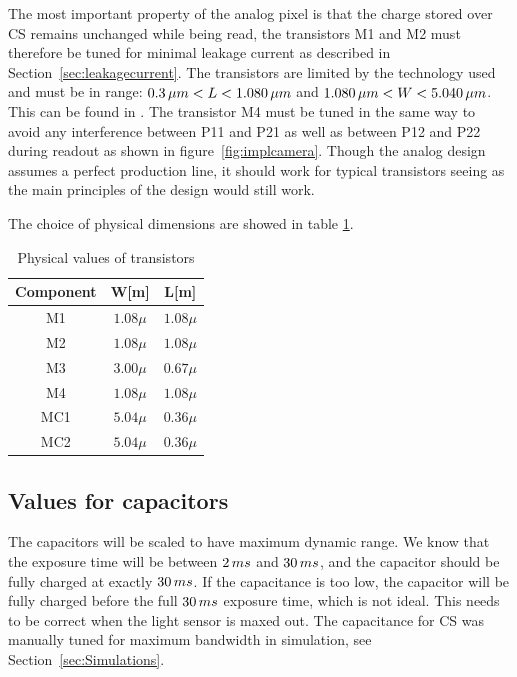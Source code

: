 The most important property of the analog pixel is that the charge stored over CS remains unchanged while being read,
the transistors M1 and M2 must therefore be tuned for minimal leakage current as described in Section~\ref{sec:leakagecurrent}.
The transistors are limited by the technology used and must be in range: $0.3 \mskip3mu \mu m < L < 1.080 \mskip3mu \mu m$ and $1.080 \mskip3mu \mu m < W < 5.040 \mskip3mu \mu m $. This can be found in \cite{oppgave}.
The transistor M4 must be tuned in the same way to avoid any interference between P11 and P21 as well as between P12 and P22 during readout as shown in figure~\ref{fig:implcamera}.
Though the analog design assumes a perfect production line, it should work for typical transistors seeing as the main principles of the design would still work.

The choice of physical dimensions are showed in table \ref{tab:transcomponentvalues}.

\begin{table}[htbp]
  \centering
  \caption{Physical values of transistors}
  \begin{tabular}{ c | c c }
    Component & W[m] & L[m] \\
    \midrule
    M1 & $1.08\mu$ & $1.08\mu$ \\
    M2 & $1.08\mu$ & $1.08\mu$ \\
    M3 & $3.00\mu$ & $0.67\mu$ \\
    M4 & $1.08\mu$ & $1.08\mu$ \\
    MC1 & $5.04\mu$ & $0.36\mu$ \\
    MC2 & $5.04\mu$ & $0.36\mu$
  \end{tabular}
  \label{tab:transcomponentvalues}
\end{table}



\subsection{Values for capacitors}

The capacitors will be scaled to have maximum dynamic range. We know that the exposure time  will be between $2 \mskip3mu ms$ and $30 \mskip3mu ms$, and the capacitor should be fully charged at exactly $30 \mskip3mu ms$. If the capacitance is too low, the capacitor will be fully charged before the full $30 \mskip3mu ms$ exposure time, which is not ideal. This needs to be correct when the light sensor is maxed out. The capacitance for CS was manually tuned for maximum bandwidth in simulation, see Section~\ref{sec:Simulations}.


